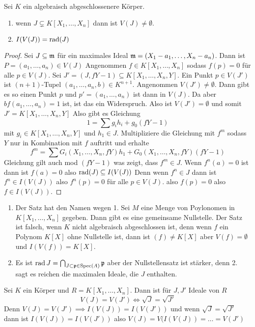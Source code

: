 \begin{Satz}[Nullstellensatz]
    Sei \(K\) ein algebraisch abgeschlossenere Körper.
    \begin{enumerate}
        \item wenn \(J\subsetneq K[X_1,\dots,X_n]\) dann ist \(V(J)\neq\emptyset\).
        \item \(I(V(J))=\operatorname{rad}(J)\)
    \end{enumerate}
\end{Satz}
\begin{proof}
    Sei \(J\subseteq\mathfrak{m}\) für ein maximales Ideal \(\mathfrak{m}=(X_1-a_1,\dots,X_n-a_n)\).
    Dann ist \(P=(a_1,\dots,a_n)\in V(J)\)
    Angenommen \(f\in K[X_1,\dots,X_n]\) sodass \(f(p)=0\) für alle \(p\in V(J)\). Sei \(J'=(J,fY-1)\subseteq K[X_1,\dots,X_n,Y]\). Ein Punkt \(p\in V(J')\) ist \((n+1)\)-Tupel \((a_1,\dots,a_n,b)\in K^{n+1}\). Angenommen \(V(J')\neq \emptyset\).
    Dann gibt es so einen Punkt \(p\) und \(p'=(a_1,\dots,a_n)\) ist dann in \(V(J)\). Da aber \(bf(a_1,\dots,a_n)=1\) ist, ist das ein Widerspruch. Also ist \(V(J')=\emptyset\) und somit \(J'=K[X_1,\dots,X_n,Y]\)
    Also gibt es Gleichung 
    \[1=\sum g_ih_i+g_0(fY-1)\] mit \(g_i\in K[X_1,\dots,X_n,Y]\) und \(h_1\in J\).
    Multipliziere die Gleichung mit \(f^m\) sodass \(Y\) nur in Kombination mit \(f\) auftritt und erhalte
    \[f^m=\sum G_i(X_1,\dots,X_n,fY)h_1+G_0(X_1,\dots,X_n,fY)(fY-1)\] Gleichung gilt auch mod \((fY-1)\) was zeigt, dass \(f^m\in J\).
    Wenn \(f^n(a)=0\) ist dann ist \(f(a)=0\) also \(\operatorname{rad}(J)\subseteq I(V(J))\) Denn wenn \(f^n\in J\) dann ist \(f^n\in I(V(J))\) also \(f^n(p)=0\) für alle \(p\in V(J)\). also \(f(p)=0\) also \(f\in I(V(J))\).
\end{proof}

\begin{Bem}
    \begin{enumerate}
        \item Der Satz hat den Namen wegen 1. Sei \(M\) eine Menge von Poylonomen in \(K[X_1,\dots,X_n]\) gegeben. Dann gibt es eine gemeinsame Nullstelle. Der Satz ist falsch, wenn \(K\) nicht algebraisch abgeschlossen ist, denn wenn \(f\) ein Polynom \(K[X]\) ohne Nullstelle ist, dann ist \((f)\neq K[X]\) aber \(V(f)=\emptyset\) und \(I(V(f))=K[X]\).
        \item Es ist \(\operatorname{rad} J=\bigcap_{J\subset \mathfrak{p}\in \operatorname{Spec}(A)}\mathfrak{p}\) aber der Nullstellensatz ist stärker, denn 2. sagt es reichen die maximalen Ideale, die \(J\) enthalten.
    \end{enumerate}
    
\end{Bem}
\begin{Bem}
    Sei \(K\) ein Körper und \(R=K[X_1,\dots,X_n]\). Dann ist für   \(J,J'\) Ideale von \(R\)
    \[V(J)=V(J')\iff \sqrt{J}=\sqrt{J'}\]
    Denn \(V(J)=V(J')\implies I(V(J))=I(V(J'))\) und wenn \(\sqrt{J}=\sqrt{J'}\) dann ist \(I(V(J))=I(V(J'))\) also \(V(J)=V(I(V(J))=\dots=V(J')\)
\end{Bem}
